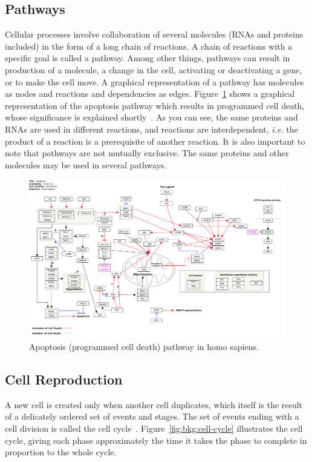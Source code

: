 \subsection{Pathways}
Cellular processes involve collaboration of several molecules (RNAs and proteins included) in the form of a long chain of reactions. A chain of reactions with a specific goal is called a pathway. Among other things, pathways can result in production of a molecule, a change in the cell, activating or deactivating a gene, or to make the cell move. A graphical representation of a pathway has molecules as nodes and reactions and dependencies as edges. Figure~\ref{fig:bkg:apoptosis-pathway} shows a graphical representation of the apoptosis pathway which results in programmed cell death, whose significance is explained shortly~\cite{bose2007p53, mott2007mir, lakin1999regulation, xiong2010effects, park2009mir}. As you can see, the same proteins and RNAs are used in different reactions, and reactions are interdependent, \emph{i.e.} the product of a reaction is a prerequisite of another reaction. It is also important to note that pathways are not mutually exclusive. The same proteins and other molecules may be used in several pathways.

\begin{figure}[!ht]
  \centering
  \includegraphics[width=1\textwidth]{figs/background/apoptosis-pathway}
  \caption{Apoptosis (programmed cell death) pathway in homo sapiens.\protect\footnotemark}
  \label{fig:bkg:apoptosis-pathway}
\end{figure}

\subsection{Cell Reproduction}
A new cell is created only when another cell duplicates, which itself is the result of a delicately ordered set of events and stages. The set of events ending with a cell division is called the cell cycle~\cite[Ch. 17]{the-cell}. Figure~\ref{fig:bkg:cell-cycle} illustrates the cell cycle, giving each phase approximately the time it takes the phase to complete in proportion to the whole cycle. 

